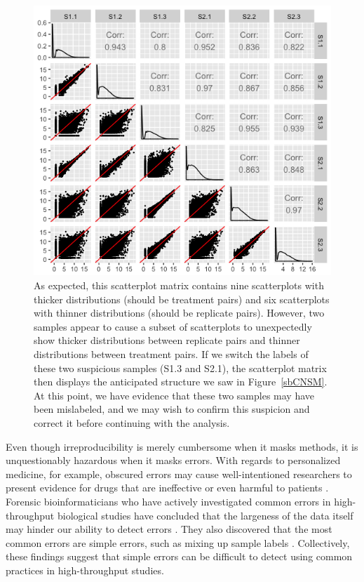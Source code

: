 \documentclass{bioinfo}
\begin{document}
\begin{figure}[!tpb]
\centerline{\includegraphics[width=\columnwidth]{../MakeFigures/sbCNSwitchedSM.jpg}}
\caption{As expected, this scatterplot matrix contains nine scatterplots with thicker distributions (should be treatment pairs) and six scatterplots with thinner distributions (should be replicate pairs). However, two samples appear to cause a subset of scatterplots to unexpectedly show thicker distributions between replicate pairs and thinner distributions between treatment pairs. If we switch the labels of these two suspicious samples (S1.3 and S2.1), the scatterplot matrix then displays the anticipated structure we saw in Figure~\ref{sbCNSM}. At this point, we have evidence that these two samples may have been mislabeled, and we may wish to confirm this suspicion and correct it before continuing with the analysis.
\label{sbCNSwitchedSM}}
\end{figure}

Even though irreproducibility is merely cumbersome when it masks methods, it is unquestionably hazardous when it masks errors. With regards to personalized medicine, for example, obscured errors may cause well-intentioned researchers to present evidence for drugs that are ineffective or even harmful to patients \citep{Baggerly}. Forensic bioinformaticians who have actively investigated common errors in high-throughput biological studies have concluded that the largeness of the data itself may hinder our ability to detect errors \citep{Baggerly}. They also discovered that the most common errors are simple errors, such as mixing up sample labels \citep{Baggerly}. Collectively, these findings suggest that simple errors can be difficult to detect using common practices in high-throughput studies.
\end{document}
